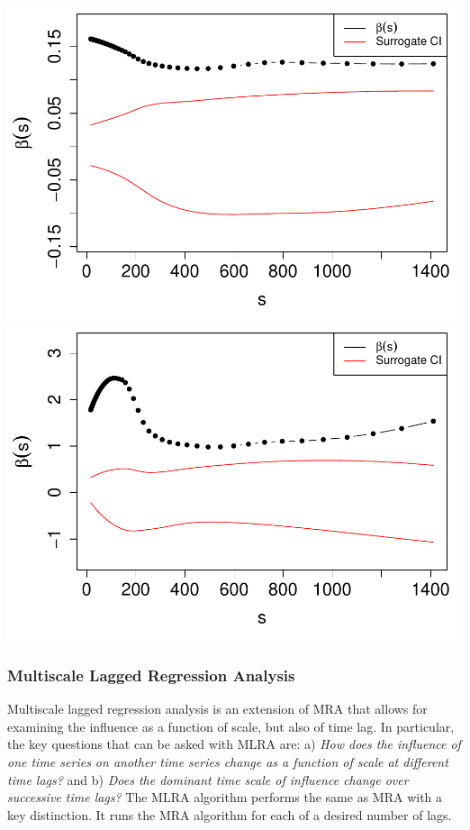 \documentclass[
  man]{apa6}
\begin{document}
\includegraphics{fractal_regression_paper_brm_files/figure-latex/unnamed-chunk-25-1.pdf} \includegraphics{fractal_regression_paper_brm_files/figure-latex/unnamed-chunk-25-2.pdf}

\hypertarget{multiscale-lagged-regression-analysis}{%
\subsubsection{Multiscale Lagged Regression Analysis}\label{multiscale-lagged-regression-analysis}}

Multiscale lagged regression analysis is an extension of MRA that allows
for examining the influence as a function of scale, but also of time
lag. In particular, the key questions that can be asked with MLRA are:
a) \emph{How does the influence of one time series on another time series
change as a function of scale at different time lags?} and b) \emph{Does the
dominant time scale of influence change over successive time lags?} The
MLRA algorithm performs the same as MRA with a key distinction. It runs
the MRA algorithm for each of a desired number of lags.
\end{document}

